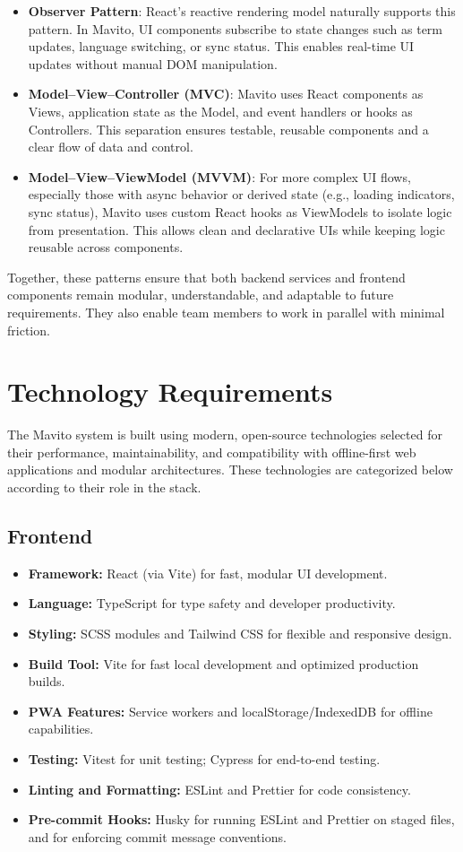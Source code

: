 \documentclass[12pt]{article}
\begin{document}
\begin{itemize}
    \item \textbf{Observer Pattern}: React’s reactive rendering model naturally supports this pattern. In Mavito, UI components subscribe to state changes such as term updates, language switching, or sync status. This enables real-time UI updates without manual DOM manipulation.

    \item \textbf{Model–View–Controller (MVC)}: Mavito uses React components as Views, application state as the Model, and event handlers or hooks as Controllers. This separation ensures testable, reusable components and a clear flow of data and control.

    \item \textbf{Model–View–ViewModel (MVVM)}: For more complex UI flows, especially those with async behavior or derived state (e.g., loading indicators, sync status), Mavito uses custom React hooks as ViewModels to isolate logic from presentation. This allows clean and declarative UIs while keeping logic reusable across components.
\end{itemize}
\newline
Together, these patterns ensure that both backend services and frontend components remain modular, understandable, and adaptable to future requirements. They also enable team members to work in parallel with minimal friction.


\section{Technology Requirements}
The Mavito system is built using modern, open-source technologies selected for their performance, maintainability, and compatibility with offline-first web applications and modular architectures. These technologies are categorized below according to their role in the stack.
\subsection{Frontend}
\begin{itemize}
  \item \textbf{Framework:} React (via Vite) for fast, modular UI development.
  \item \textbf{Language:} TypeScript for type safety and developer productivity.
  \item \textbf{Styling:} SCSS modules and Tailwind CSS for flexible and responsive design.
  \item \textbf{Build Tool:} Vite for fast local development and optimized production builds.
  \item \textbf{PWA Features:} Service workers and localStorage/IndexedDB for offline capabilities.
  \item \textbf{Testing:} Vitest for unit testing; Cypress for end-to-end testing.
  \item \textbf{Linting and Formatting:} ESLint and Prettier for code consistency.
  \item \textbf{Pre-commit Hooks:} Husky for running ESLint and Prettier on staged files, and for enforcing commit message conventions.
\end{itemize}
\end{document}
